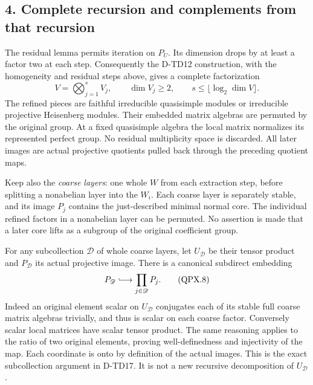 \subsection*{4. Complete recursion and complements from that recursion}

The residual lemma permits iteration on \(P_U\).
Its dimension drops by at least a factor two at each step.
Consequently the D-TD12 construction, with the homogeneity
and residual steps above, gives a complete factorization
\[
 V=\bigotimes_{j=1}^{s} V_j,\qquad
 \dim V_j\ge2,\qquad s\le\lfloor\log_2\dim V\rfloor.
 \tag{QPX.7}
\]
The refined pieces are faithful irreducible quasisimple modules
or irreducible projective Heisenberg modules. Their embedded
matrix algebras are permuted by the original group. At a fixed
quasisimple algebra the local matrix normalizes its represented
perfect group. No residual multiplicity space is discarded.
All later images are actual projective quotients pulled back
through the preceding quotient maps.

Keep also the \emph{coarse layers}: one whole \(W\) from
each extraction step, before splitting a nonabelian layer into
the \(W_i\). Each coarse layer is separately stable, and its
image \(P_j\) contains the just-described minimal normal core.
The individual refined factors in a nonabelian layer can be
permuted. No assertion is made that a later core lifts as a
subgroup of the original coefficient group.

For any subcollection \(\mathscr D\) of whole coarse layers,
let \(U_{\mathscr D}\) be their tensor product and \(P_{\mathscr D}\)
its actual projective image. There is a canonical subdirect
embedding
\[
       P_{\mathscr D}\lhook\joinrel\longrightarrow
                       \prod_{j\in\mathscr D}P_j.
 \tag{QPX.8}
\]
Indeed an original element scalar on \(U_{\mathscr D}\)
conjugates each of its stable full coarse matrix algebras
trivially, and thus is scalar on each coarse factor.
Conversely scalar local matrices have scalar tensor product.
The same reasoning applies to the ratio of two original
elements, proving well-definedness and injectivity of the
map. Each coordinate is onto by definition of the actual
images. This is the exact subcollection argument in D-TD17.
It is not a new recursive decomposition of \(U_{\mathscr D}\).

